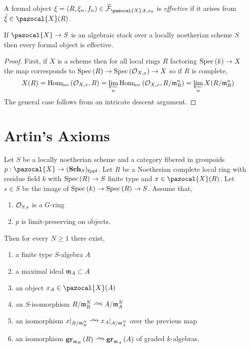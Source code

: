 \documentclass[12pt]{article}
\renewcommand{\X}{\pazocal{X}}
\renewcommand{\F}{\mathcal{F}}
\begin{document}
\begin{defn}
A formal object $\xi = (R, \xi_n, f_n) \in \wh{\F}_{\X, k, x_0}$ is \textit{effective} if it arises from $\tilde{\xi} \in \X(R)$.
\end{defn}

\begin{lemma}
If $\X \to S$ is an algebraic stack over a locally noetherian scheme $S$ then every formal object is effective.
\end{lemma}

\begin{proof}
First, if $X$ is a scheme then for all local rings $R$ factoring $\mathrm{Spec}\left( k \right) \to X$ the map corresponds to $\mathrm{Spec}\left( R \right) \to \mathrm{Spec}\left( \mathcal{O}_{X, x} \right) \to X$ so if $R$ is complete,
\[ X(R) = \mathrm{Hom}_{\text{loc}} \left( \mathcal{O}_{X, x}, R \right) = \varprojlim_{n} \mathrm{Hom}_{\text{loc}} \left( \mathcal{O}_{X, x}, R/\mathfrak{m}_R^n \right) = \varprojlim_n X(R/\mathfrak{m}_R^n) \]
The general case follows from an intricate descent argument.
\end{proof}

\section{Artin's Axioms}

\begin{theorem}
Let $S$ be a locally noetherian scheme and a category fibered in groupoids $p : \X \to (\Sch_S)_{\fppf}$. Let $R$ be a Noetherian complete local ring with residue field $k$ with $\mathrm{Spec}\left( R \right) \to S$ finite type and $x \in \X(R)$. Let $s \in S$ be the image of $\mathrm{Spec}\left( k \right) \to \mathrm{Spec}\left( R \right) \to S$. Assume that,
\begin{enumerate}
\item $\mathcal{O}_{S, s}$ is a $G$-ring
\item $p$ is limit-preserving on objects.
\end{enumerate}
Then for every $N \ge 1$ there exist,
\begin{enumerate}
\item a finite type $S$-algebra $A$
\item a maximal ideal $\mathfrak{m}_A \subset A$
\item an object $x_A \in \X(A)$
\item an $S$-isomorphism $R / \m_R^N \iso A / \m_A^N$
\item an isomorphism $x|_{R/\m_R^N} \iso x_A |_{A / \m_A^N}$ over the previous map
\item an isomorphism $\gr{\m_R}{R} \iso \gr{\m_A}{A}$ of graded $k$-algebras.
\end{enumerate}
\end{theorem}
\end{document}
